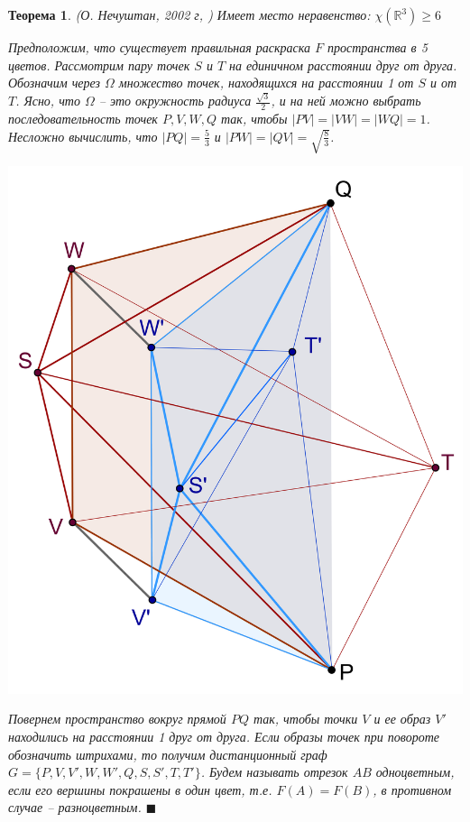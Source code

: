 \documentclass{report}%
\newtheorem{theorem}{Теорема}
\newenvironment{proof}{\par\noindent{\bf Доказательство.}}{\hfill$\scriptstyle\blacksquare$}
\begin{document}
\begin{theorem} (О. Нечуштан, 2002 г, \cite{Nechushtan2002})
		Имеет место неравенство: $\chi(\mathbb{R}^3) \geq 6$ \\
		\begin{proof}
				Предположим, что существует правильная раскраска $F$ пространства в 5 цветов. 
				Рассмотрим пару точек $S$ и $T$ на единичном расстоянии друг от друга.
				Обозначим через $\Omega$ множество точек, находящихся на расстоянии 1 от $S$ и от $T$.
				Ясно, что $\Omega$ – это окружность радиуса $\frac{\sqrt{3}}{2}$, и на ней можно выбрать последовательность точек
				$P, V, W, Q$ так, чтобы $|PV| = |VW| = |WQ| = 1$. Несложно вычислить,
				что $|PQ| = \frac{5}{3}$  и  $|PW| = |QV| = \sqrt{\frac{8}{3}}$. \\
				\begin{center}
						\includegraphics[scale = 0.25]{nechushtan}
				\end{center}
			
			  Повернем пространство вокруг прямой $PQ$ так, чтобы точки $V$ и ее образ $V'$
				находились на расстоянии 1 друг от друга. Если образы точек при повороте обозначить штрихами,
				то получим дистанционный граф $G = \{P, V, V', W, W' ,Q, S, S', T, T'\}$.
				Будем называть отрезок $AB$ одноцветным, если его вершины покрашены в один цвет,
				т.е. $F(A) = F(B)$, в противном случае – разноцветным.
		\end{proof}
\end{theorem}
\end{document}
